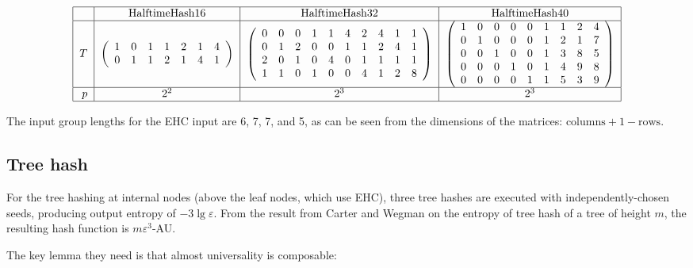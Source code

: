 \documentclass[runningheads]{llncs}
\begin{document}
\[
\begin{tabular}{|r|c|c|c|}
  \hline  & HalftimeHash16 & HalftimeHash32 & HalftimeHash40 \\
  \hline $T$ &
$\left(
\begin{array}{rrrrrrrrrrrr}
  1 & 0 & 1 & 1 & 2 & 1 & 4\\
  0 & 1 & 1 & 2 & 1 & 4 & 1
\end{array}
\right)$
&
$\left(
\begin{array}{rrrrrrrrrr}
 0 & 0 & 0 & 1 & 1 & 4 & 2 & 4 & 1 & 1 \\
 0 & 1 & 2 & 0 & 0 & 1 & 1 & 2 & 4 & 1 \\
 2 & 0 & 1 & 0 & 4 & 0 & 1 & 1 & 1 & 1 \\
 1 & 1 & 0 & 1 & 0 & 0 & 4 & 1 & 2 & 8
\end{array}
\right)$
&
$\left(
\begin{array}{rrrrrrrrr}
 1 & 0 & 0 & 0 & 0 & 1 & 1 & 2 & 4\\
 0 & 1 & 0 & 0 & 0 & 1 & 2 & 1 & 7\\
 0 & 0 & 1 & 0 & 0 & 1 & 3 & 8 & 5\\
 0 & 0 & 0 & 1 & 0 & 1 & 4 & 9 & 8\\
 0 & 0 & 0 & 0 & 1 & 1 & 5 & 3 & 9
\end{array}
\right)$ \\
\hline $p$ & $2^2$ & $2^3$ & $2^3$ \\
\hline
\end{tabular}
\]

The input group lengths for the EHC input are 6, 7, 7, and 5, as can be seen from the dimensions of the matrices: $\text{columns} + 1 - \text{rows}$.

\subsection{Tree hash}

For the tree hashing at internal nodes (above the leaf nodes, which use EHC), three tree hashes are executed with independently-chosen seeds, producing output entropy of $-3 \lg \varepsilon$.
From the result from Carter and Wegman on the entropy of tree hash of a tree of height $m$, the resulting hash function is $m\varepsilon^3$-AU.

The key lemma they need is that almost universality is composable:
\end{document}
